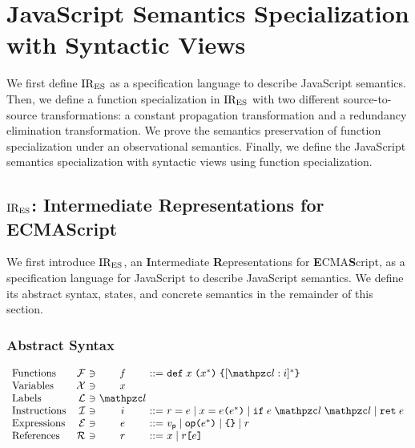 \section{JavaScript Semantics Specialization with Syntactic Views}\label{sec:formal}

We first define $\text{IR}_\text{ES}$ as a specification language to describe JavaScript
semantics.  Then, we define a function specialization in $\text{IR}_\text{ES}$ with two
different source-to-source transformations: a constant propagation
transformation and a redundancy elimination transformation.  We prove the
semantics preservation of function specialization under an observational
semantics.  Finally, we define the JavaScript semantics specialization with
syntactic views using function specialization.

\subsection{$\text{IR}_\text{ES}$: Intermediate Representations for ECMAScript}

We first introduce $\text{IR}_\text{ES}$, an \textbf{I}ntermediate \textbf{R}epresentations
for \textbf{E}CMA\textbf{S}cript, as a specification language for JavaScript to
describe JavaScript semantics. We define its abstract syntax, states, and
concrete semantics in the remainder of this section.

\subsubsection{Abstract Syntax}

\[
  \begin{array}{lr@{~}c@{~}c@{~}c@{~}l}
    \text{Functions} & \funcset &\ni& \func &::=&
    \kwdef \; x \; \kwrl x^* \kwrr \; \kwcl [\lab: \inst]^* \kwcr\\

    \text{Variables} & \varset &\ni& x\\

    \text{Labels} & \labset &\ni& \lab\\

    \text{Instructions} & \instset &\ni& \inst &::=&
    \refer = \expr \mid
    x = \expr \kwrl \expr^* \kwrr \mid
    \kwif \; \expr \; \lab \; \lab \mid
    \kwret \; \expr\\

    \text{Expressions} & \exprset &\ni& \expr &::=&
    \pval \mid
    \op \kwrl \expr^* \kwrr \mid
    \kwcl \kwcr \mid
    \refer\\

    \text{References} & \referset &\ni& \refer &::=&
    x \mid \refer \kwsl \expr \kwsr\\
  \end{array}
\]


